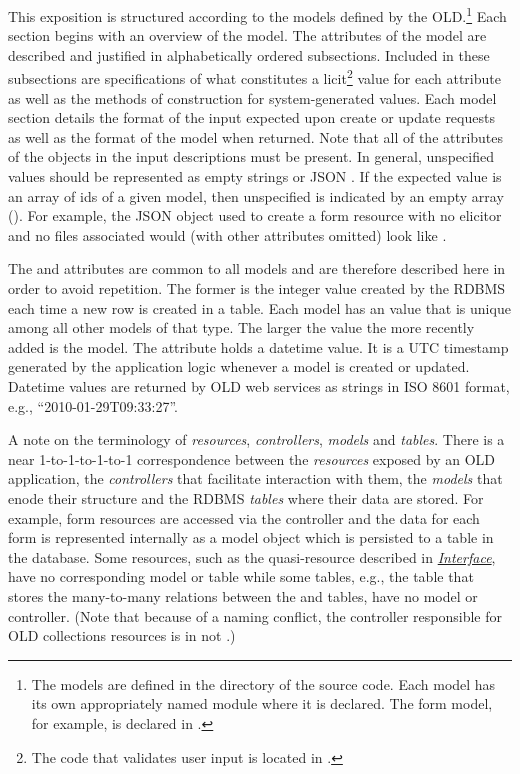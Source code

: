 \documentclass[letterpaper,10pt,english]{sphinxmanual}
\begin{document}
This exposition is structured according to the models defined by the OLD.\footnote{
The models are defined in the  directory of the source code.
Each model has its own appropriately named module where it is declared.  The
form model, for example, is declared in .
}
Each section begins with an overview of the model.  The attributes of the model
are described and justified in alphabetically ordered subsections.  Included in
these subsections are specifications of what constitutes a licit\footnote{
The code that validates user input is located in .
} value
for each attribute as well as the methods of construction for system-generated
values.  Each model section details the format of the input expected upon create
or update requests as well as the format of the model when returned.  Note that
all of the attributes of the objects in the input descriptions must be present.
In general, unspecified values should be represented as empty strings or JSON
.  If the expected value is an array of ids of a given model, then
unspecified is indicated by an empty array (\code{{[}{]}}).  For example, the JSON
object used to create a form resource with no elicitor and no files associated
would (with other attributes omitted) look like
.

The  and  attributes are common to all models and are
therefore described here in order to avoid repetition.  The former is the
integer value created by the RDBMS each time a new row is created in a table.
Each model has an  value that is unique among all other models of that
type.  The larger the  value the more recently added is the model.  The
 attribute holds a datetime value.  It is a UTC timestamp
generated by the application logic whenever a model is created or updated.
Datetime values are returned by OLD web services as strings in ISO 8601 format,
e.g., ``2010-01-29T09:33:27''.

A note on the terminology of \emph{resources}, \emph{controllers}, \emph{models} and \emph{tables}.
There is a near 1-to-1-to-1-to-1 correspondence between the \emph{resources} exposed
by an OLD application, the \emph{controllers} that facilitate interaction with them,
the \emph{models} that enode their structure and the RDBMS \emph{tables} where their data
are stored.  For example, form resources are accessed via the 
controller and the data for each form is represented internally as a 
model object which is persisted to a  table in the database.  Some
resources, such as the  quasi-resource described in
{\hyperref[interface:interface]{\emph{Interface}}}, have no corresponding model or table while some tables, e.g.,
the  table that stores the many-to-many relations between the
 and  tables, have no model or controller.  (Note that because
of a naming conflict, the controller responsible for OLD collections resources
is in  not .)
\end{document}
